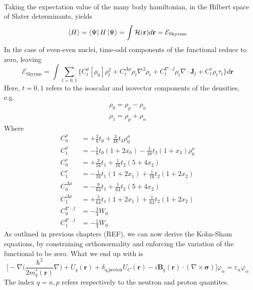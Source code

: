 \\Taking the expectation value of the many body hamiltonian, in the Hilbert space of Slater determinants, yields
\begin{equation}
    \expval{H} = \bra{\Psi} H \ket{\Psi} = \int \mathcal H (\mathbf r)d\mathbf r = \mathcal E_\text{Skyrme}
\end{equation}
In the case of even-even nuclei, time-odd components of the functional reduce to zero, leaving \cite{stevenson2019low}
\begin{equation}
    \mathcal E_\text{Skyrme} = \int \sum_{t=0,1}\bigg\{C_t^\rho [\rho_0]\rho_t^2+C_t^{\Delta \rho}\rho_t\nabla^2\rho_t+C_t^{\nabla\cdot J}\rho_t\nabla\cdot \mathbf J_t + C_t^\tau\rho_t\tau_t\bigg\}d\mathbf r
\end{equation}
Here, $t=0,1$ refers to the isoscalar and isovector components of the densities, e.g.
\begin{align*}
    \rho_0 = \rho_p - \rho_n
    \\\rho_1 = \rho_p + \rho_n
\end{align*}
Where
\begin{align}
    C_0^\rho &= +\frac 3 8 t_0 + \frac 3 {48} t_3\rho_0^\sigma 
    \\C_1^\rho &= -\frac 1 8 t_0(1+2x_0)- \frac 1 {48} t_3(1+x_3)\rho_0^\sigma 
    \\C_0^\tau &= +\frac 3 {16} t_1 + \frac 1 {16} t_2 (5+4x_2)
    \\C_1^\tau &= -\frac 1 {16} t_1(1+2x_1)+\frac 1 {16}t_2(1+2x_2)
    \\C_0^{\Delta \rho} &= -\frac 9 {64}t_1+\frac 1 {64}t_2(5+4x_2)
    \\C_1^{\Delta \rho} &= +\frac 3 {64}t_1(1+2x_1)+\frac 1 {64}t_2(1+2x_2)
    \\C_0^{\nabla\cdot J} &= -\frac 3 4 W_0
    \\C_1^{\nabla\cdot J} &= -\frac 1 4 W_0
\end{align}
As outlined in previous chapters (REF), we can now derive the Kohn-Sham equations, by constraining orthonormality and enforcing the variation of the functional to be zero. What we end up with is
\begin{equation}
    \bigg[-\nabla\bigg(\frac{\hbar^2}{2m^{*}_q(\mathbf r)}\nabla \bigg) + U_q(\mathbf r) + \delta_{\text{q,proton}}U_C(\mathbf r)-i\mathbf B_q(\mathbf r)\cdot(\nabla \times \boldsymbol\sigma) \bigg]\varphi_\alpha=\varepsilon_\alpha\varphi_\alpha
\end{equation}
The index $q=n,p$ refers respectively to the neutron and proton quantites.
